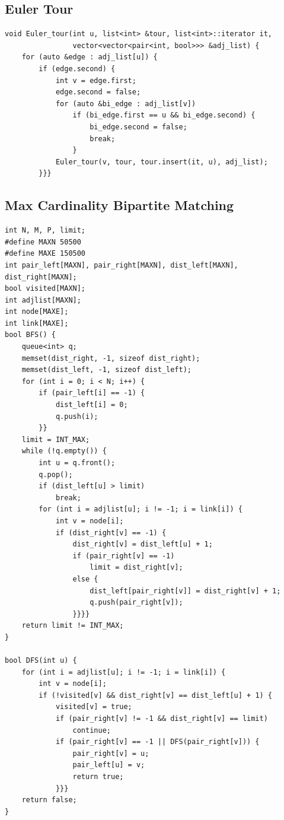 \documentclass[10pt,landscape]{article}
\begin{document}
\begin{multicols}{2}
\subsection{Euler Tour}
\begin{lstlisting}
void Euler_tour(int u, list<int> &tour, list<int>::iterator it, 
                vector<vector<pair<int, bool>>> &adj_list) {
    for (auto &edge : adj_list[u]) {
        if (edge.second) {
            int v = edge.first;
            edge.second = false;
            for (auto &bi_edge : adj_list[v]) 
                if (bi_edge.first == u && bi_edge.second) {
                    bi_edge.second = false;
                    break;
                }
            Euler_tour(v, tour, tour.insert(it, u), adj_list);
        }}}
\end{lstlisting}

\subsection{Max Cardinality Bipartite Matching}
\begin{lstlisting}
int N, M, P, limit;
#define MAXN 50500
#define MAXE 150500
int pair_left[MAXN], pair_right[MAXN], dist_left[MAXN], dist_right[MAXN];
bool visited[MAXN];
int adjlist[MAXN];
int node[MAXE];
int link[MAXE];
bool BFS() {
    queue<int> q;
    memset(dist_right, -1, sizeof dist_right);
    memset(dist_left, -1, sizeof dist_left);
    for (int i = 0; i < N; i++) {
        if (pair_left[i] == -1) {
            dist_left[i] = 0;
            q.push(i);
        }}
    limit = INT_MAX;
    while (!q.empty()) {
        int u = q.front();
        q.pop();
        if (dist_left[u] > limit)
            break;
        for (int i = adjlist[u]; i != -1; i = link[i]) {
            int v = node[i];
            if (dist_right[v] == -1) {
                dist_right[v] = dist_left[u] + 1;
                if (pair_right[v] == -1)
                    limit = dist_right[v];
                else {
                    dist_left[pair_right[v]] = dist_right[v] + 1;
                    q.push(pair_right[v]);
                }}}}
    return limit != INT_MAX;
}
 
bool DFS(int u) {
    for (int i = adjlist[u]; i != -1; i = link[i]) {
        int v = node[i];
        if (!visited[v] && dist_right[v] == dist_left[u] + 1) {
            visited[v] = true;
            if (pair_right[v] != -1 && dist_right[v] == limit)
                continue;
            if (pair_right[v] == -1 || DFS(pair_right[v])) {
                pair_right[v] = u;
                pair_left[u] = v;
                return true;
            }}}
    return false;
}
 

\end{lstlisting}
\end{multicols}
\end{document}
